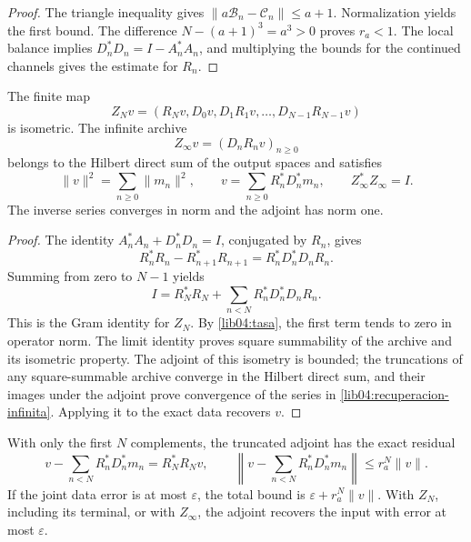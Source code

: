 \begin{proof}
The triangle inequality gives
\(\|a\mathcal B_n-\mathcal C_n\|\leq a+1\). Normalization
yields the first bound. The difference
\(N-(a+1)^3=a^3>0\) proves \(r_a<1\). The local balance implies
\(D_n^*D_n=I-A_n^*A_n\), and multiplying the bounds for the
continued channels gives the estimate for \(R_n\).
\end{proof}

\begin{theorem}
\label{lib04:teo-archivo}
The finite map
\begin{equation}
 Z_Nv=(R_Nv,D_0v,D_1R_1v,\ldots,D_{N-1}R_{N-1}v)
 \label{lib04:zn}
\end{equation}
is isometric. The infinite archive
\begin{equation}
 Z_\infty v=(D_nR_nv)_{n\geq0}
 \label{lib04:zinfty}
\end{equation}
belongs to the Hilbert direct sum of the output spaces and satisfies
\begin{equation}
 \|v\|^2=\sum_{n\geq0}\|m_n\|^2,\qquad
 v=\sum_{n\geq0}R_n^*D_n^*m_n,
 \qquad Z_\infty^*Z_\infty=I.
 \label{lib04:recuperacion-infinita}
\end{equation}
The inverse series converges in norm and the adjoint has norm one.
\end{theorem}

\begin{proof}
The identity \(A_n^*A_n+D_n^*D_n=I\), conjugated by \(R_n\),
gives
\[
 R_n^*R_n-R_{n+1}^*R_{n+1}=R_n^*D_n^*D_nR_n.
\]
Summing from zero to \(N-1\) yields
\begin{equation}
 I=R_N^*R_N+\sum_{n<N}R_n^*D_n^*D_nR_n.
 \label{lib04:telescopia}
\end{equation}
This is the Gram identity for \(Z_N\). By
\eqref{lib04:tasa}, the first term tends to zero in operator
norm. The limit identity proves square summability of the
archive and its isometric property. The adjoint of this isometry is bounded;
the truncations of any square-summable archive converge in the Hilbert
direct sum, and their images under the adjoint prove convergence of the
series in \eqref{lib04:recuperacion-infinita}. Applying it to the exact
data recovers \(v\).
\end{proof}

With only the first \(N\) complements, the truncated adjoint has
the exact residual
\begin{equation}
 v-\sum_{n<N}R_n^*D_n^*m_n=R_N^*R_Nv,
 \qquad
 \left\|v-\sum_{n<N}R_n^*D_n^*m_n\right\|
 \leq r_a^N\|v\|.
 \label{lib04:sesgo-truncado}
\end{equation}
If the joint data error is at most \(\varepsilon\), the
total bound is \(\varepsilon+r_a^N\|v\|\). With \(Z_N\), including
its terminal, or with \(Z_\infty\), the adjoint recovers the input with error
at most \(\varepsilon\).

